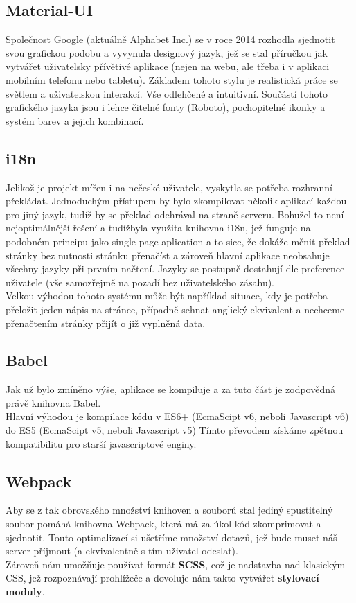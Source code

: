 \subsection{Material-UI}
Společnost Google (aktuálně Alphabet Inc.) se v roce 2014 rozhodla sjednotit svou grafickou podobu a
vyvynula designový jazyk, jež se stal příručkou jak vytvářet uživatelsky přívětivé aplikace (nejen na webu, ale třeba
i v aplikaci mobilním telefonu nebo tabletu). Základem tohoto stylu je realistická práce se světlem
a uživatelskou interakcí. Vše odlehčené a intuitivní. Součástí tohoto grafického jazyka jsou i
lehce čitelné fonty (Roboto), pochopitelné ikonky a systém barev a jejich kombinací.

\subsection{i18n}
Jelikož je projekt mířen i na nečeské uživatele, vyskytla se potřeba rozhranní překládat.
Jednoduchým přístupem by bylo zkompilovat několik aplikací každou pro jiný jazyk, tudíž
by se překlad odehrával na straně serveru. Bohužel to není nejoptimálnější řešení a
tudížbyla využita knihovna i18n, jež funguje na podobném principu jako single-page aplication a
to sice, že dokáže měnit překlad stránky bez nutnosti stránku přenačíst a zároveň hlavní aplikace
neobsahuje všechny jazyky při prvním načtení. Jazyky se postupně dostahují dle preference uživatele
(vše samozřejmě na pozadí bez uživatelského zásahu).\\
Velkou výhodou tohoto systému může být například situace, kdy je potřeba přeložit jeden nápis na stránce,
případně sehnat anglický ekvivalent a nechceme přenačtením stránky přijít o již vyplněná data.

\subsection{Babel}
Jak už bylo zmíněno výše, aplikace se kompiluje a za tuto část je zodpovědná právě knihovna Babel.\\
Hlavní výhodou je kompilace kódu v ES6+ (EcmaScipt v6, neboli Javascript v6) do ES5 (EcmaScipt v5, neboli Javascript v5)
Tímto převodem získáme zpětnou kompatibilitu pro starší javascriptové enginy.

\subsection{Webpack}
Aby se z tak obrovského množství knihoven a souborů stal jediný spustitelný soubor pomáhá
knihovna Webpack, která má za úkol kód zkomprimovat a sjednotit. Touto optimalizací si ušetříme
množství dotazů, jež bude muset náš server příjmout (a ekvivalentně s tím uživatel odeslat).\\
Zároveň nám umožňuje používat formát \textbf{SCSS}, což je nadstavba nad klasickým CSS, jež 
rozpoznávají prohlížeče a dovoluje nám takto vytvářet \textbf{stylovací moduly}.

